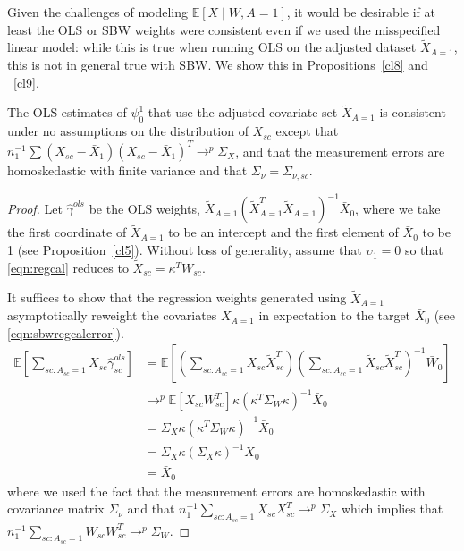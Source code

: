 Given the challenges of modeling $\mathbb{E}[X \mid W, A = 1]$, it would be desirable if at least the OLS or SBW weights were consistent even if we used the misspecified linear model: while this is true when running OLS on the adjusted dataset $\tilde{X}_{A=1}$, this is not in general true with SBW. We show this in Propositions~\ref{cl8} and ~\ref{cl9}.

\begin{proposition}\label{cl8}
    The OLS estimates of $\psi_0^1$ that use the adjusted covariate set $\tilde{X}_{A=1}$ is consistent under no assumptions on the distribution of $X_{sc}$ except that $n_1^{-1}\sum (X_{sc} - \bar{X}_1) (X_{sc} - \bar{X}_1)^T \to^p \Sigma_X$, and that the measurement errors are homoskedastic with finite variance and that $\Sigma_{\nu} = \Sigma_{\nu, sc}$. 
\end{proposition}

\begin{proof}
    Let $\hat{\gamma}^{ols}$ be the OLS weights, $\tilde{X}_{A=1}(\tilde{X}_{A=1}^T\tilde{X}_{A=1})^{-1}\bar{X}_0$, where we take the first coordinate of $\tilde{X}_{A=1}$ to be an intercept and the first element of $\bar{X}_0$ to be 1 (see Proposition~\ref{cl5}).
    Without loss of generality, assume that $\upsilon_1 = 0$ so that \eqref{eqn:regcal} reduces to $\tilde{X}_{sc} = \kappa^TW_{sc}$.
    
    It suffices to show that the regression weights generated using $\tilde{X}_{A=1}$ asymptotically reweight the covariates $X_{A=1}$ in expectation to the target $\bar{X}_0$ (see \eqref{eqn:sbwregcalerror}).  
    \begin{align*}
        \mathbb{E}[\sum_{sc: A_{sc} = 1}X_{sc}\hat{\gamma}^{ols}_{sc}] &= \mathbb{E}[(\sum_{sc: A_{sc} = 1} X_{sc}\tilde{X}_{sc}^T)(\sum_{sc: A_{sc} = 1} \tilde{X}_{sc}\tilde{X}_{sc}^T)^{-1}\bar{W}_0] \\
        &\to^p \mathbb{E}[X_{sc}W_{sc}^T]\kappa(\kappa^T\Sigma_W\kappa)^{-1}\bar{X}_0 \\ 
        &= \Sigma_X\kappa(\kappa^T\Sigma_W\kappa)^{-1}\bar{X}_0 \\ 
        &= \Sigma_X\kappa(\Sigma_X\kappa)^{-1}\bar{X}_0 \\ 
        &= \bar{X}_0
    \end{align*}
    where we used the fact that the measurement errors are homoskedastic with covariance matrix $\Sigma_{\nu}$ and that $n_1^{-1}\sum_{sc: A_{sc} = 1}X_{sc}X_{sc}^T \to^p \Sigma_X$ which implies that $n_1^{-1}\sum_{sc: A_{sc} = 1}W_{sc}W_{sc}^T \to^p \Sigma_W$. 
\end{proof}

